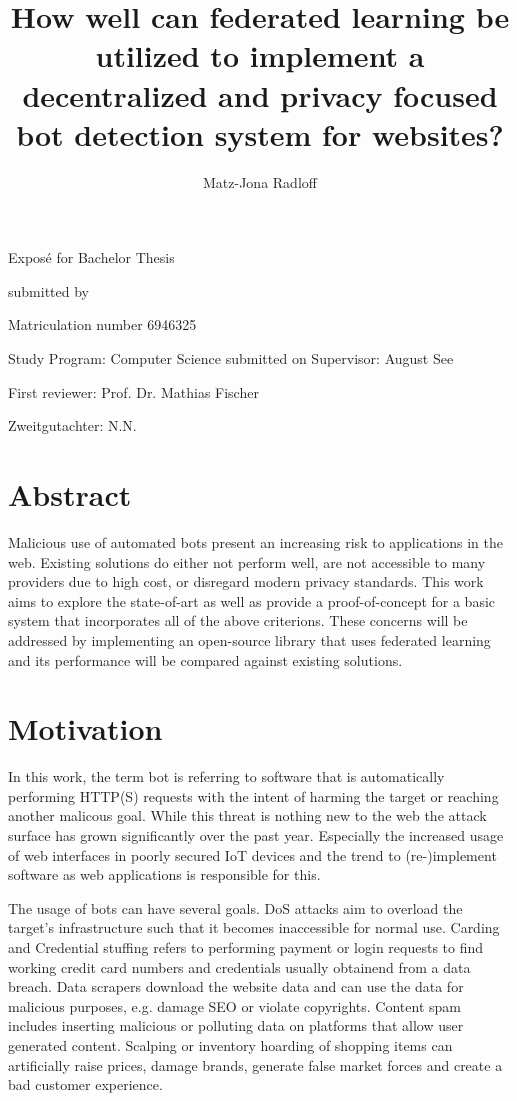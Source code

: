 \documentclass[
    fontsize=12pt,
    headings=small,
    parskip=half,           %
    bibliography=totoc,
    numbers=noenddot,       %
    open=any,               %
    final                   %
    ]{scrreprt}
\title{How well can federated learning be utilized to implement a decentralized and privacy focused bot detection system for websites?}
\author{Matz-Jona Radloff}
\begin{document}
\begin{titlepage}
\begin{center}\Large
	\vfill
    Exposé for Bachelor Thesis
	\vfill
	\makeatletter
	{\Large\textsf{\textbf{\@title}}\par}
	\makeatother
	\vfill
    submitted by
	\par\bigskip
	\makeatletter
	{\@author} \par
	\makeatother
	Matriculation number 6946325 \par
	Study Program: Computer Science
	\vfill
	\makeatletter
	submitted on {\@date}
	\makeatother
	\vfill
	Supervisor: August See\par
	First reviewer: Prof. Dr. Mathias Fischer \par
	Zweitgutachter: N.N.
\end{center}
\end{titlepage}


\chapter*{Abstract}

Malicious use of automated bots present an increasing risk to applications in the web. Existing solutions do either not perform well, are not accessible to many providers due to high cost, or disregard modern privacy standards. This work aims to explore the state-of-art as well as provide a proof-of-concept for a basic system that incorporates all of the above criterions. These concerns will be addressed by implementing an open-source library that uses federated learning and its performance will be compared against existing solutions.

\tableofcontents

\chapter{Motivation}

In this work, the term bot is referring to software that is automatically performing HTTP(S) requests with the intent of harming the target or reaching another malicous goal. While this threat is nothing new to the web the attack surface has grown significantly over the past year. Especially the increased usage of web interfaces in poorly secured IoT devices and the trend to (re-)implement software as web applications is responsible for this.

The usage of bots can have several goals. DoS attacks aim to overload the target's infrastructure such that it becomes inaccessible for normal use. Carding and Credential stuffing refers to performing payment or login requests to find working credit card numbers and credentials usually obtainend from a data breach. Data scrapers download the website data and can use the data for malicious purposes, e.g. damage SEO or violate copyrights. Content spam includes inserting malicious or polluting data on platforms that allow user generated content. Scalping or inventory hoarding of shopping items can artificially raise prices, damage brands, generate false market forces and create a bad customer experience.
\end{document}
